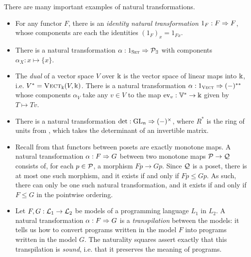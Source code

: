 \begin{ex}
  There are many important examples of natural transformations.
  \begin{itemize}
    \item For any functor $F$, there is an \emph{identity natural transformation
      $1_F: F\Rightarrow F$}, whose components are each the identities $(1_F)_x = 1_{Fx}$.
    \item There is a natural transformation $\alpha: 1_{\textsc{\text{Set}}}\Rightarrow
      \mathcal{P}_\exists$ with components $\alpha_X: x\mapsto \{x\}$.
    \item The \emph{dual} of a vector space $V$ over $\Bbbk$ is the vector space
      of linear maps into $\Bbbk$, i.e. $V^* = {\textsc{\text{Vect}}}_\Bbbk(V, \Bbbk)$. There is
      a natural transformation $\alpha: 1_{{\textsc{\text{Vect}}}}\Rightarrow (-)^{**}$ whose
      components $\alpha_V$ take any $v\in V$ to the map $\text{ev}_v:
      \mathbb{V}^*\to\Bbbk$ given by $T\mapsto Tv$.
    \item There is a natural transformation $\det:\text{GL}_n\Rightarrow (-)^\times$, where
      $R^*$ is the ring of units from , which
      takes the determinant of an invertible matrix.
    \item Recall from  that functors between posets
      are exactly monotone maps. A natural transformation $\alpha: F\Rightarrow G$
      between two monotone maps $\mathcal{P}\to\mathcal{Q}$ consists of, for each $p\in\mathcal{P}$, a
      morphism $Fp\to Gp$. Since $\mathcal{Q}$ is a poset, there is at most one such
      morphism, and it exists if and only if $Fp\leq Gp$. As such, there can
      only be one such natural transformation, and it exists if and only if
      $F\leq G$ in the pointwise ordering.
    \item Let $F,G:\mathcal{L}_1\to\mathcal{L}_2$ be models of a programming language $L_1$ in
      $L_2$. A natural transformation $\alpha: F\Rightarrow G$ is a \emph{transpilation}
      between the models: it tells us how to convert programs written in the
      model $F$ into programs written in the model $G$. The naturality squares
      assert exactly that this transpilation is \emph{sound}, i.e. that it
      preserves the meaning of programs.
 \end{itemize}
\end{ex}

